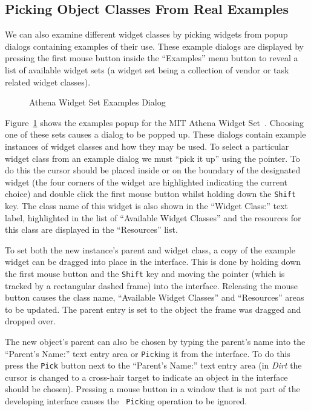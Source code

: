 \subsection{Picking Object Classes From Real Examples}
\label{sec:examples}
We can also examine different widget classes by picking widgets from popup
dialogs containing examples of their use.  These example dialogs are displayed
by pressing the first mouse button inside the ``Examples''
menu button to reveal
a list of available widget sets (a widget set being a collection of vendor
or task related widget classes).
\begin{figure}
\centerline{}
\caption{Athena Widget Set Examples Dialog}
\label{fig:xaw-examples}
\end{figure}
Figure~\ref{fig:xaw-examples} shows the examples popup for the MIT Athena
Widget Set~\cite{XawWidgets}.  Choosing one of these sets causes a dialog
to be popped up.  These dialogs contain example instances of widget classes
and how they may be used.  To select a particular widget class from an
example dialog we must ``pick it up'' using the pointer.  To do this the
cursor should be placed inside or on the boundary of the designated widget (the
four corners of the widget are highlighted indicating the current choice) and
double
click the first mouse button whilst holding down the {\tt Shift} key.  The class
name of this widget is also shown in the ``Widget Class:'' text label,
highlighted in the list of ``Available Widget Classes'' and the resources for
this class are displayed in the ``Resources'' list.

To set both the new
instance's parent and widget class, a copy of the example widget can be
dragged into place in the interface. This is done by holding down the first
mouse button and the {\tt Shift} key and moving the pointer
(which is tracked by a
rectangular dashed frame) into the interface.  Releasing the mouse button
causes the class name, ``Available Widget Classes'' and ``Resources'' areas
to be updated.  The parent entry is set to the object the frame was dragged
and dropped over.

The new object's parent can also be chosen by typing the parent's name into
the ``Parent's Name:'' text entry area or {\tt Pick}ing it from the interface.
To do this press the {\tt Pick} button next to the ``Parent's Name:'' text entry
area (in {\em Dirt} the cursor is changed to a cross-hair target to indicate
an object in the interface should be chosen).  Pressing a mouse button in
a window that is not part of the developing interface causes the {\tt
Pick}ing operation to be ignored.

